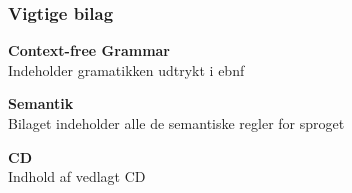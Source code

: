 \subsubsection*{Vigtige bilag}
\begin{itemize_small}
    \item \textbf{Context-free Grammar}\\
    Indeholder gramatikken udtrykt i \gls{ebnf}
    \item \textbf{Semantik}\\
    Bilaget indeholder alle de semantiske regler for sproget
    \item \textbf{CD}\\
    Indhold af vedlagt CD
\end{itemize_small}

